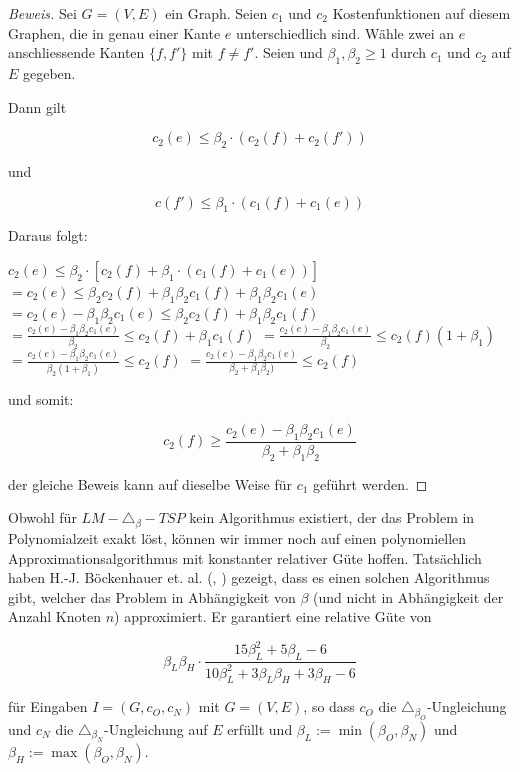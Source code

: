 \documentclass[a4paper,11pt]{scrreprt}
\begin{document}
\begin{proof}[Beweis]
Sei $G = (V, E)$ ein Graph. Seien $c_1$ und $c_2$ Kostenfunktionen auf diesem Graphen, die in genau einer Kante $e$ unterschiedlich sind. Wähle zwei an $e$ anschliessende Kanten $\{f, f'\}$ mit $f \not= f'$. Seien und $\beta_1, \beta_2 \ge 1$ durch $c_1$ und $c_2$ auf $E$ gegeben. 

Dann gilt

\[ c_2(e) \le \beta_2 \cdot (c_2(f) + c_2(f')) \]

und 

\[ c(f') \le \beta_1 \cdot (c_1(f) + c_1(e)) \]

Daraus folgt:

$ c_2(e) \le \beta_2 \cdot [c_2(f) + \beta_1 \cdot (c_1(f) + c_1(e))] $ $ = c_2(e) \le \beta_2 c_2(f) + \beta_1\beta_2 c_1(f) + \beta_1\beta_2 c_1(e) $ $ = c_2(e) - \beta_1\beta_2 c_1(e) \le \beta_2 c_2(f) + \beta_1\beta_2 c_1(f) $ $ = \frac{c_2(e) - \beta_1\beta_2 c_1(e)}{\beta_2} \le c_2(f) + \beta_1 c_1(f) $ $ = \frac{c_2(e) - \beta_1\beta_2 c_1(e)}{\beta_2} \le c_2(f)(1 + \beta_1) $ $ = \frac{c_2(e) - \beta_1\beta_2 c_1(e)}{\beta_2(1 + \beta_1)} \le c_2(f) $ $ = \frac{c_2(e) - \beta_1\beta_2 c_1(e)}{\beta_2 + \beta_1\beta_2)} \le c_2(f) $

und somit:

\[ c_2(f) \ge  \frac{c_2(e) - \beta_1\beta_2 c_1(e)}{\beta_2 + \beta_1\beta_2} \]

der gleiche Beweis kann auf dieselbe Weise für $c_1$ geführt werden.
\end{proof}



Obwohl für $LM-\triangle_\beta-TSP$ kein Algorithmus existiert, der das Problem in Polynomialzeit exakt löst, können wir immer noch auf einen polynomiellen Approximationsalgorithmus mit konstanter relativer Güte hoffen. Tatsächlich haben H.-J. Böckenhauer et. al. (\cite{bok1}, \cite{bok2}) gezeigt, dass es einen solchen Algorithmus gibt, welcher das Problem in Abhängigkeit von $\beta$ (und nicht in Abhängigkeit der Anzahl Knoten $n$) approximiert. Er garantiert eine  relative Güte von

\[ \beta_L\beta_H \cdot \frac{15\beta_L^2 + 5\beta_L - 6}{10\beta_L^2 + 3\beta_L\beta_H + 3\beta_H -6} \]

für Eingaben $I = (G, c_O, c_N)$ mit $G = (V, E)$, so dass $c_O$ die $\triangle_{\beta_O}$-Ungleichung und $c_N$ die $\triangle_{\beta_N}$-Ungleichung auf $E$ erfüllt und $\beta_L := \min(\beta_O,\beta_N)$ und $\beta_H := \max(\beta_O,\beta_N)$. 
\end{document}
